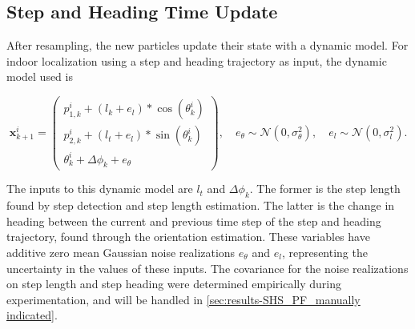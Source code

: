 	
\subsection{Step and Heading Time Update}
\label{sec:meth-pf-SHS_time_update}
	After resampling, the new particles update their state with a dynamic model. For indoor localization using a step and heading trajectory as input, the dynamic model used is
	
	\begin{equation}
		\label{eq:SHS_dynamic_model_with_noise}
		\mathbf{x}^i_{k + 1}
		=
		\left(\begin{array}{l}
			p_{1,k}^i + (l_{k} + e_l) * \cos (\theta_{k}^i) \\
			p_{2,k}^i + (l_{t} + e_l) * \sin (\theta_{k}^i) \\
			\theta_{k}^i + \Delta \phi_k + e_\theta 
		\end{array}\right), \quad
		e_{\theta} \sim \mathcal{N}\left(0, \sigma_{\theta}^{2}\right), \quad e_{l} \sim \mathcal{N}\left(0, \sigma_{l}^{2}\right).
	\end{equation}

The inputs to this dynamic model are $l_{t}$ and $\Delta \phi_k$. The former is the step length found by step detection and step length estimation. The latter is the change in heading between the current and previous time step of the step and heading trajectory, found through the orientation estimation. These variables have additive zero mean Gaussian noise realizations $e_{\theta}$ and $e_{l}$, representing the uncertainty in the values of these inputs. The covariance for the noise realizations on step length and step heading were determined empirically during experimentation, and will be handled in \cref{sec:results-SHS_PF_manually indicated}.\par 


